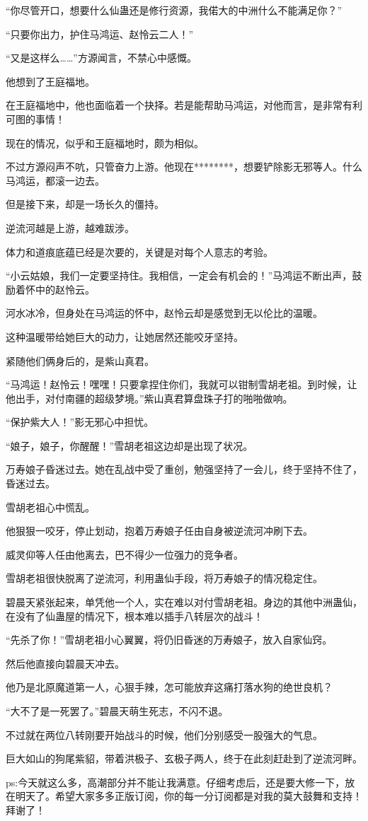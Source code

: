 \begin{this_body}
“你尽管开口，想要什么仙蛊还是修行资源，我偌大的中洲什么不能满足你？”

“只要你出力，护住马鸿运、赵怜云二人！”

“又是这样么……”方源闻言，不禁心中感慨。

他想到了王庭福地。

在王庭福地中，他也面临着一个抉择。若是能帮助马鸿运，对他而言，是非常有利可图的事情！

现在的情况，似乎和王庭福地时，颇为相似。

不过方源闷声不吭，只管奋力上游。他现在********，想要铲除影无邪等人。什么马鸿运，都滚一边去。

但是接下来，却是一场长久的僵持。

逆流河越是上游，越难跋涉。

体力和道痕底蕴已经是次要的，关键是对每个人意志的考验。

“小云姑娘，我们一定要坚持住。我相信，一定会有机会的！”马鸿运不断出声，鼓励着怀中的赵怜云。

河水冰冷，但身处在马鸿运的怀中，赵怜云却是感觉到无以伦比的温暖。

这种温暖带给她巨大的动力，让她居然还能咬牙坚持。

紧随他们俩身后的，是紫山真君。

“马鸿运！赵怜云！嘿嘿！只要拿捏住你们，我就可以钳制雪胡老祖。到时候，让他出手，对付南疆的超级梦境。”紫山真君算盘珠子打的啪啪做响。

“保护紫大人！”影无邪心中担忧。

“娘子，娘子，你醒醒！”雪胡老祖这边却是出现了状况。

万寿娘子昏迷过去。她在乱战中受了重创，勉强坚持了一会儿，终于坚持不住了，昏迷过去。

雪胡老祖心中慌乱。

他狠狠一咬牙，停止划动，抱着万寿娘子任由自身被逆流河冲刷下去。

威灵仰等人任由他离去，巴不得少一位强力的竞争者。

雪胡老祖很快脱离了逆流河，利用蛊仙手段，将万寿娘子的情况稳定住。

碧晨天紧张起来，单凭他一个人，实在难以对付雪胡老祖。身边的其他中洲蛊仙，在没有了仙蛊屋的情况下，根本难以插手八转层次的战斗！

“先杀了你！”雪胡老祖小心翼翼，将仍旧昏迷的万寿娘子，放入自家仙窍。

然后他直接向碧晨天冲去。

他乃是北原魔道第一人，心狠手辣，怎可能放弃这痛打落水狗的绝世良机？

“大不了是一死罢了。”碧晨天萌生死志，不闪不退。

不过就在两位八转刚要开始战斗的时候，他们分别感受一股强大的气息。

巨大如山的狗尾紫貂，带着洪极子、玄极子两人，终于在此刻赶赴到了逆流河畔。

ps:今天就这么多，高潮部分并不能让我满意。仔细考虑后，还是要大修一下，放在明天了。希望大家多多正版订阅，你的每一分订阅都是对我的莫大鼓舞和支持！拜谢了！

\end{this_body}

